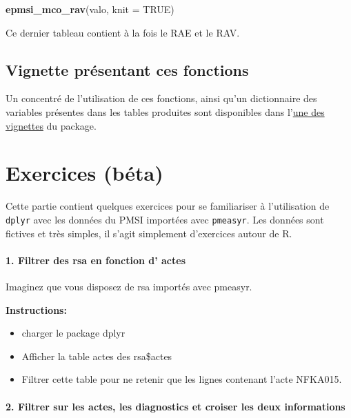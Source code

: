 \documentclass[]{book}
\newenvironment{Shaded}{\begin{snugshade}}{\end{snugshade}}
\newcommand{\KeywordTok}[1]{\textcolor[rgb]{0.13,0.29,0.53}{\textbf{#1}}}
\newcommand{\DataTypeTok}[1]{\textcolor[rgb]{0.13,0.29,0.53}{#1}}
\newcommand{\OtherTok}[1]{\textcolor[rgb]{0.56,0.35,0.01}{#1}}
\newcommand{\NormalTok}[1]{#1}
\begin{document}
\begin{Shaded}
\begin{Highlighting}[]
\KeywordTok{epmsi_mco_rav}\NormalTok{(valo, }\DataTypeTok{knit =} \OtherTok{TRUE}\NormalTok{)}
\end{Highlighting}
\end{Shaded}

Ce dernier tableau contient à la fois le RAE et le RAV.

\section{Vignette présentant ces
fonctions}\label{vignette-presentant-ces-fonctions}

Un concentré de l'utilisation de ces fonctions, ainsi qu'un dictionnaire
des variables présentes dans les tables produites sont disponibles dans
l'\href{https://im-aphp.github.io/pmeasyr/articles/vignette4.html}{une
des vignettes} du package.

\chapter{Exercices (béta)}\label{exercices-beta}

Cette partie contient quelques exercices pour se familiariser à
l'utilisation de \texttt{dplyr} avec les données du PMSI importées avec
\texttt{pmeasyr}. Les données sont fictives et très simples, il s'agit
simplement d'exercices autour de R.

\subsubsection{1. Filtrer des rsa en fonction d'
actes}\label{filtrer-des-rsa-en-fonction-d-actes}

Imaginez que vous disposez de rsa importés avec pmeasyr.

\textbf{Instructions:}

\begin{itemize}
\item
  charger le package dplyr
\item
  Afficher la table actes des rsa\$actes
\item
  Filtrer cette table pour ne retenir que les lignes contenant l'acte
  NFKA015.
\end{itemize}

\subsubsection{2. Filtrer sur les actes, les diagnostics et croiser les
deux
informations}\label{filtrer-sur-les-actes-les-diagnostics-et-croiser-les-deux-informations}
\end{document}
